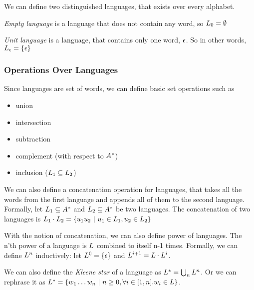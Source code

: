 We can define two distinguished languages, that exists over every alphabet.

\begin{definition}
	\emph{Empty language} is a language that does not contain any word, so $L_{0} = \emptyset$
\end{definition}

\begin{definition}
	\emph{Unit language} is a language, that contains only one word, $\epsilon$. So in other words, $L_{\epsilon} = \{ \epsilon \}$
\end{definition}

\subsubsection{Operations Over Languages}

Since languages are set of words, we can define basic set operations such as 
\begin{itemize}
	\item union
	\item intersection
	\item subtraction
	\item complement (with respect to $A^{*}$)
	\item inclusion ($L_{1} \subseteq L_{2}$)
\end{itemize}

We can also define a concatenation operation for languages, that takes all the words from the first language and appends all of them to the second language. Formally, let $L_{1} \subseteq A^{*}$ and $L_{2} \subseteq A^{*}$ be two languages. The concatenation of two languages is $L_{1} \cdot L_{2} = \{ u_1 u_2 ~ | ~ u_1 \in L_{1}, u_2 \in L_{2} \}$

With the notion of concatenation, we can also define power of languages. The n'th power of a language \languagesymbol is $L$ combined to itself n-1 times. Formally, we can define $L^{n}$ inductively: let $L^{0} = \{ \epsilon \}$ and $L^{i+1} = L \cdot L^{i} $.

We can also define the \emph{Kleene star} of a language as $L^{*} = \bigcup_n L^{n}$. Or we can rephrase it as $L^{*} = \{ w_{1} \ldots w_{n} ~ | ~ n \geq 0, \forall i \in [1,n]. w_{i} \in L \}$.


